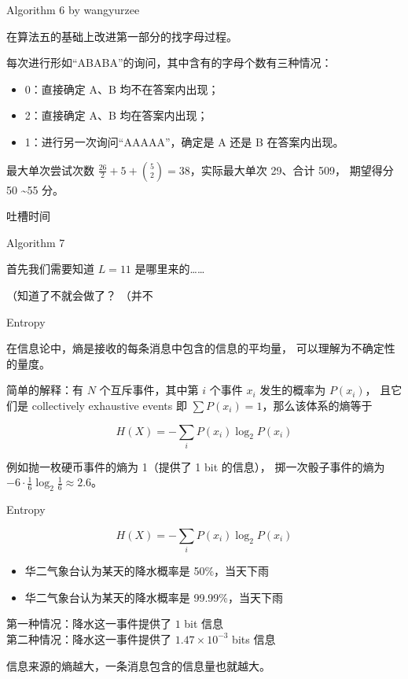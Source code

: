 \documentclass[UTF8]{beamer}
\begin{document}
\begin{frame}{Algorithm 6 by wangyurzee}

在算法五的基础上改进第一部分的找字母过程。

\pause 每次进行形如“ABABA”的询问，其中含有的字母个数有三种情况：
\begin{itemize}
    \item 0：直接确定 A、B 均不在答案内出现；
    \item 2：直接确定 A、B 均在答案内出现；
    \item 1：进行另一次询问“AAAAA”，确定是 A 还是 B 在答案内出现。
\end{itemize} 

\pause 最大单次尝试次数 $\frac{26}{2} + 5 + \binom{5}{2} = 38$，实际最大单次 29、合计 509，
期望得分 50 \textasciitilde 55 分。

\end{frame}

\begin{frame}{吐槽时间}
\end{frame}

\begin{frame}{Algorithm 7}

首先我们需要知道 $L = 11$ 是哪里来的……

\pause （知道了不就会做了？
\pause （并不

\end{frame}

\begin{frame}{Entropy}


在信息论中，熵是接收的每条消息中包含的信息的平均量，%
可以理解为不确定性的量度。

简单的解释：有 $N$ 个互斥事件，其中第 $i$ 个事件 $x_i$ 发生的概率为 $P(x_i)$，
且它们是 collectively exhaustive events 即 $\sum P(x_i) = 1$，那么该体系的熵等于

$$
    H(X) = -\sum_{i} P(x_i) \log_2 P(x_i)
$$

例如抛一枚硬币事件的熵为 1（提供了 1 bit 的信息），%
掷一次骰子事件的熵为 $-6 \cdot \frac{1}{6} \log_2 \frac{1}{6} \approx 2.6$。

\end{frame}

\begin{frame}{Entropy}

$$
    H(X) = -\sum_{i} P(x_i) \log_2 P(x_i)
$$

\begin{itemize}
    \item {}华二气象台认为某天的降水概率是 50\%，当天下雨
    \item {}华二气象台认为某天的降水概率是 99.99\%，当天下雨
\end{itemize}

\pause
第一种情况：降水这一事件提供了 $1$ bit 信息\\
第二种情况：降水这一事件提供了 $1.47 \times 10^{-3}$ bits 信息 \newline\newline

信息来源的熵越大，一条消息包含的信息量也就越大。

\end{frame}
\end{document}
